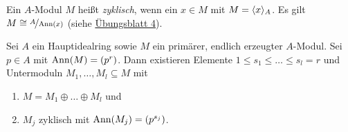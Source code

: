 \documentclass[12pt,a4paper]{scrartcl}
\theoremstyle{cplain}
\theoremstyle{cdef}
\begin{document}
\begin{defi}
	Ein $A$-Modul $M$ heißt \emph{zyklisch}, wenn ein $x\in M$ mit $M = \langle x\rangle_A$. Es gilt $M\cong \nicefrac{A}{\operatorname{Ann}(x)}$ (siehe \href{http://www.math.uni-bonn.de/ag/stroppel/Franzen_Algebra_1_Uebung/Blatt4.pdf}{Übungsblatt 4}).
\end{defi}

\begin{satz} \label{thm:zerlegung primaer zyklisch}
	Sei $A$ ein Hauptidealring sowie $M$ ein primärer, endlich erzeugter $A$-Modul. Sei $p\in A$ mit $\operatorname{Ann}(M) = (p^r)$. Dann existieren Elemente $1\leq s_1\leq\dots \leq s_l = r$ und  Untermoduln $M_1,\dots, M_l\subseteq M$ mit
	\begin{enumerate}
		\item $M = M_1\oplus\dots\oplus M_l$ und
		\item $M_j$ zyklisch mit $\operatorname{Ann}(M_j) =(p^{s_j})$.
	\end{enumerate}
\end{satz}
\end{document}
